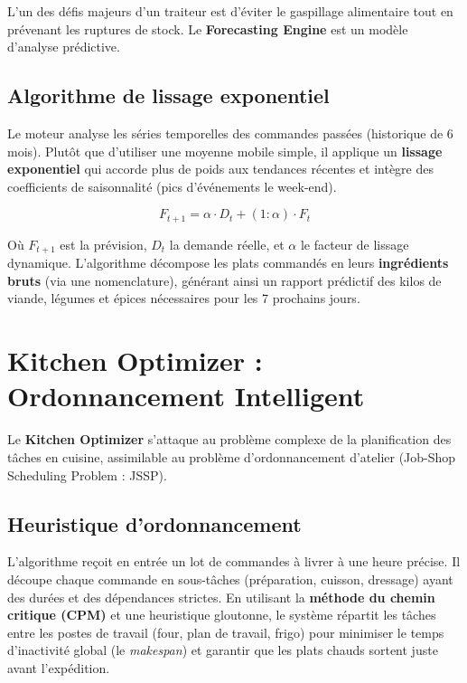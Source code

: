 L'un des défis majeurs d'un traiteur est d'éviter le gaspillage alimentaire tout en prévenant les ruptures de stock. Le \textbf{Forecasting Engine} est un modèle d'analyse prédictive.

\subsection{Algorithme de lissage exponentiel}

Le moteur analyse les séries temporelles des commandes passées (historique de 6 mois). Plutôt que d'utiliser une moyenne mobile simple, il applique un \textbf{lissage exponentiel} qui accorde plus de poids aux tendances récentes et intègre des coefficients de saisonnalité (pics d'événements le week-end).

$$
F_{t+1} = \alpha \cdot D_t + (1 : \alpha) \cdot F_t
$$

Où $F_{t+1}$ est la prévision, $D_t$ la demande réelle, et $\alpha$ le facteur de lissage dynamique. L'algorithme décompose les plats commandés en leurs \textbf{ingrédients bruts} (via une nomenclature), générant ainsi un rapport prédictif des kilos de viande, légumes et épices nécessaires pour les 7 prochains jours.

\section{Kitchen Optimizer : Ordonnancement Intelligent}

Le \textbf{Kitchen Optimizer} s'attaque au problème complexe de la planification des tâches en cuisine, assimilable au problème d'ordonnancement d'atelier (Job-Shop Scheduling Problem : JSSP).

\subsection{Heuristique d'ordonnancement}

L'algorithme reçoit en entrée un lot de commandes à livrer à une heure précise. Il découpe chaque commande en sous-tâches (préparation, cuisson, dressage) ayant des durées et des dépendances strictes.
En utilisant la \textbf{méthode du chemin critique (CPM)} et une heuristique gloutonne, le système répartit les tâches entre les postes de travail (four, plan de travail, frigo) pour minimiser le temps d'inactivité global (le \textit{makespan}) et garantir que les plats chauds sortent juste avant l'expédition.

